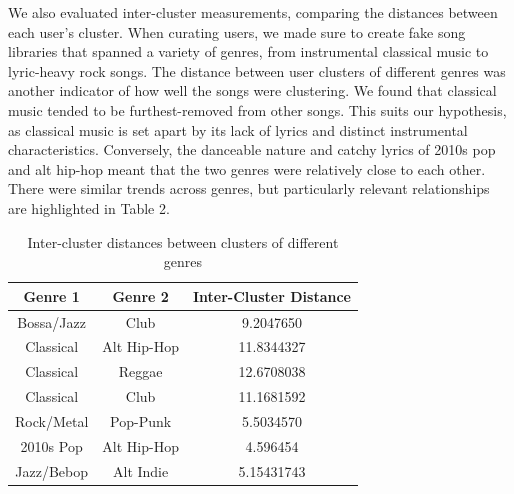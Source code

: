 We also evaluated inter-cluster measurements, comparing the distances between each user’s cluster. When curating users, we made sure to create fake song libraries that spanned a variety of genres, from instrumental classical music to lyric-heavy rock songs. The distance between user clusters of different genres was another indicator of how well the songs were clustering. We found that classical music tended to be furthest-removed from other songs. This suits our hypothesis, as classical music is set apart by its lack of lyrics and distinct instrumental characteristics. Conversely, the danceable nature and catchy lyrics of 2010s pop and alt hip-hop meant that the two genres were relatively close to each other. There were similar trends across genres, but particularly relevant relationships are highlighted in Table 2.

\begin{table}[ht]
    \centering
    \begin{tabular}{ccc}\toprule
         Genre 1&  Genre 2& Inter-Cluster Distance\\\midrule
         Bossa/Jazz&  Club& 9.2047650\\
         Classical&  Alt Hip-Hop& 11.8344327\\
         Classical&  Reggae& 12.6708038\\
 Classical& Club&11.1681592\\
         Rock/Metal&  Pop-Punk& 5.5034570\\
         2010s Pop&  Alt Hip-Hop& 4.596454\\ 
 Jazz/Bebop& Alt Indie&5.15431743\\ \bottomrule
    \end{tabular}
    \caption{Inter-cluster distances between clusters of different genres}
    \label{tab:placeholder}
\end{table}